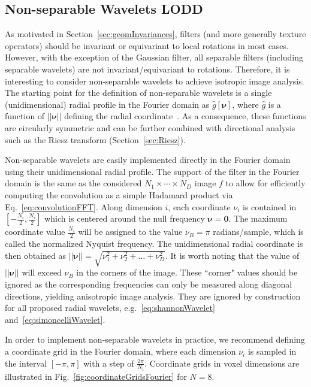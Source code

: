 \documentclass[fleqn,a4paper,oneside,openany]{book}
\newcommand\id[1]{{\hfill\normalsize{\idfont #1}}}
\renewcommand{\marginnote}[2][]{}
\begin{document}
\subsection[Non-separable Wavelets]{Non-separable Wavelets \id{LODD}}\label{sec:nonseparableWavelets}
%
\marginnote{\footnotesize v4: Extended description of non-separable wavelets.}
As motivated in  Section~\ref{sec:geomInvariances}, filters (and more generally texture operators) should be invariant or equivariant to local rotations in most cases. 
However, with the exception of the Gaussian filter, all separable filters (including separable wavelets) are not invariant/equivariant to rotations.
Therefore, it is interesting to consider non-separable wavelets to achieve isotropic image analysis.
The starting point for the definition of non-separable wavelets is a single (unidimensional) radial profile in the Fourier domain as $\hat{g}[\boldsymbol{\nu}]$, where $\hat{g}$ is a function of $||\boldsymbol{\nu}||$ defining the radial coordinate~\cite{UCV2011}.
As a consequence, these functions are circularly symmetric and can be further combined with directional analysis such as the Riesz transform (Section~\ref{sec:Riesz}).

Non-separable wavelets are easily implemented directly in the Fourier domain using their unidimensional radial profile.
The support of the filter in the Fourier domain is the same as the considered $N_1\times\cdots\times N_D$ image $f$ to allow for efficiently computing the convolution as a simple Hadamard product via Eq.~\eqref{eq:convolutionFFT}.
Along dimension $i$, each coordinate $\nu_i$ is contained in $[-\frac{N_i}{2},\frac{N_i}{2}]$ which is centered around the null frequency $\boldsymbol{\nu}=\boldsymbol{0}$.
The maximum coordinate value $\frac{N_i}{2}$ will be assigned to the value $\nu_{B}=\pi$ radians/sample, which is called the normalized Nyquist frequency.
The unidimensional radial coordinate is then obtained as $||\boldsymbol{\nu}||=\sqrt{\nu_1^2+\nu_2^2+\dots+\nu_D^2}$.
It is worth noting that the value of $||\boldsymbol{\nu}||$ will exceed $\nu_B$ in the corners of the image. These ``corner" values should be ignored as the corresponding frequencies can only be measured along diagonal directions, yielding anisotropic image analysis. They are ignored by construction for all proposed radial wavelets, e.g.~\eqref{eq:shannonWavelet} and~\eqref{eq:simoncelliWavelet}.


In order to implement non-separable wavelets in practice, we recommend defining a coordinate grid in the Fourier domain, where each dimension $\nu_i$ is sampled in the interval $[-\pi,\pi]$ with a step of $\frac{2\pi}{N_i}$.
Coordinate grids in voxel dimensions are illustrated in Fig.~\ref{fig:coordinateGridsFourier} for $N=8$.
\end{document}

